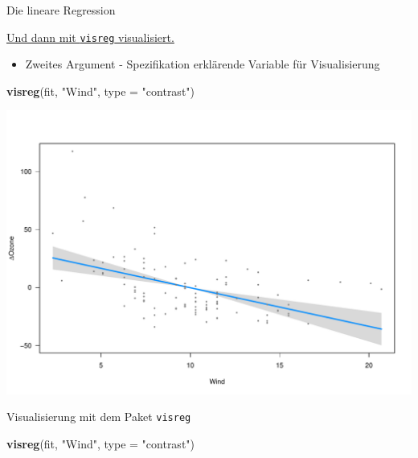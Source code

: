 \documentclass[ignorenonframetext,]{beamer}
\newenvironment{Shaded}{}{}
\newcommand{\KeywordTok}[1]{\textcolor[rgb]{0.00,0.44,0.13}{\textbf{{#1}}}}
\newcommand{\DataTypeTok}[1]{\textcolor[rgb]{0.56,0.13,0.00}{{#1}}}
\newcommand{\StringTok}[1]{\textcolor[rgb]{0.25,0.44,0.63}{{#1}}}
\newcommand{\NormalTok}[1]{{#1}}
\providecommand{\tightlist}{%
\setlength{\itemsep}{0pt}\setlength{\parskip}{0pt}}
\begin{document}
\begin{frame}[fragile]{Die lineare Regression}
\begin{block}{\href{http://myweb.uiowa.edu/pbreheny/publications/visreg.pdf}{Und
dann mit \texttt{visreg} visualisiert.}}

\begin{itemize}
\tightlist
\item
  Zweites Argument - Spezifikation erklärende Variable für
  Visualisierung
\end{itemize}

\begin{Shaded}
\begin{Highlighting}[]
\KeywordTok{visreg}\NormalTok{(fit, }\StringTok{"Wind"}\NormalTok{, }\DataTypeTok{type =} \StringTok{"contrast"}\NormalTok{)}
\end{Highlighting}
\end{Shaded}

\includegraphics{R_intern_files/figure-beamer/unnamed-chunk-305-1.pdf}

\end{block}

\begin{block}{Visualisierung mit dem Paket \texttt{visreg}}

\begin{Shaded}
\begin{Highlighting}[]
\KeywordTok{visreg}\NormalTok{(fit, }\StringTok{"Wind"}\NormalTok{, }\DataTypeTok{type =} \StringTok{"contrast"}\NormalTok{)}
\end{Highlighting}
\end{Shaded}


\end{block}
\end{frame}
\end{document}
